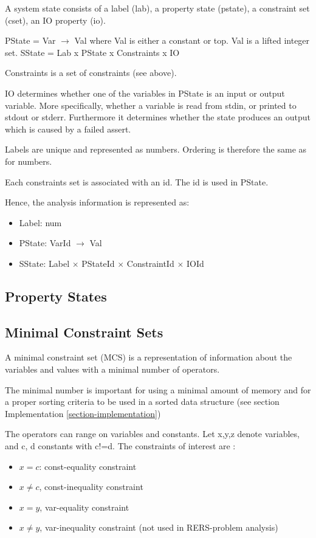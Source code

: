 A system state consists of a label (lab), a property state (pstate), a constraint set (cset), an IO property (io).

PState = Var $\rightarrow$ Val where Val is either a constant or top. Val is a lifted integer set.
SState = Lab x PState x Constraints x IO

Constraints is a set of constraints (see above).

IO determines whether one of the variables in PState is an input or output variable. More specifically, whether a variable is read from stdin, or printed to stdout or stderr. Furthermore it determines whether the state produces an output which is caused by a failed assert.

Labels are unique and represented as numbers. Ordering is therefore the same as for numbers.

Each constraints set is associated with an id. The id is used in PState.

Hence, the analysis information is represented as:

\begin{itemize}
\item Label: num
\item PState: VarId $\rightarrow$ Val
\item SState: Label $\times$ PStateId $\times$ ConstraintId $\times$ IOId
\end{itemize}

\subsection{Property States}


\subsection{Minimal Constraint Sets}
A minimal constraint set (MCS) is a representation of
information about the variables and values with a minimal number of operators.

 The minimal number is
important for using a minimal amount of memory and for a proper
sorting criteria to be used in a sorted data structure (see section Implementation \ref{section-implementation})

The operators can range on variables and constants. Let x,y,z denote variables, and c, d constants with c!=d.
The constraints of interest are : 
\begin{itemize}
\item $x=c$: const-equality constraint
\item $x\neq c$, const-inequality constraint
\item $x=y$, var-equality constraint
\item $x\neq y$, var-inequality constraint (not used in RERS-problem analysis)
\end{itemize}

